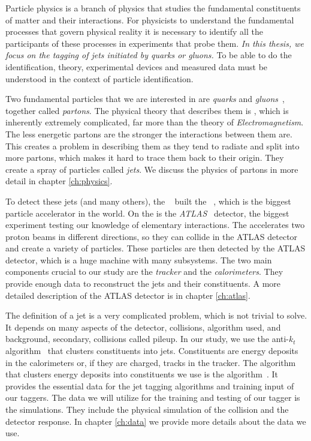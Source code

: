 

Particle physics is a branch of physics that studies the fundamental constituents of matter and their interactions.
For physicists to understand the fundamental processes that govern physical reality it is necessary to identify all the participants of these processes in experiments that probe them. 
\emph{In this thesis, we focus on the tagging of jets initiated by quarks or gluons.}
To be able to do the identification, theory, experimental devices and measured data must be understood in the context of particle identification.

Two fundamental particles that we are interested in are \emph{quarks} and \emph{gluons}~\cite{quarks}, together called \emph{partons}.
The physical theory that describes them is \QCD, which is inherently extremely complicated, far more than the theory of \emph{Electromagnetism}.
The less energetic partons are the stronger the interactions between them are. 
This creates a problem in describing them as they tend to radiate and split into more partons, which makes it hard to trace them back to their origin.
They create a spray of particles called \emph{jets}.
We discuss the physics of partons in more detail in chapter \cref{ch:physics}.

To detect these jets (and many others), the \CERN~\cite{cern} built the \LHC~\cite{LHC}, which is the biggest particle accelerator in the world.
On the \LHC is the \emph{ATLAS}~\cite{ATLAS} detector, the biggest experiment testing our knowledge of elementary interactions. 
The \LHC accelerates two proton beams in different directions, so they can collide in the ATLAS detector and create a variety of particles.
These particles are then detected by the ATLAS detector, which is a huge machine with many subsystems.
The two main components crucial to our study are the \emph{tracker} and the \emph{calorimeters}.
They provide enough data to reconstruct the jets and their constituents.
A more detailed description of the ATLAS detector is in chapter \cref{ch:atlas}.

The definition of a jet is a very complicated problem, which is not trivial to solve.
It depends on many aspects of the detector, collisions, algorithm used, and background, secondary, collisions called pileup.
In our study, we use the anti-$k_t$ algorithm~\cite{antikt} that clusters constituents into jets.
Constituents are energy deposits in the calorimeters or, if they are charged, tracks in the tracker.
The algorithm that clusters energy deposits into constituents we use is the \PFa algorithm~\cite{PFO}.
It provides the essential data for the jet tagging algorithms and training input of our taggers.
The data we will utilize for the training and testing of our tagger is the \MC simulations.
They include the physical simulation of the collision and the detector response.
In chapter \cref{ch:data} we provide more details about the data we use.

